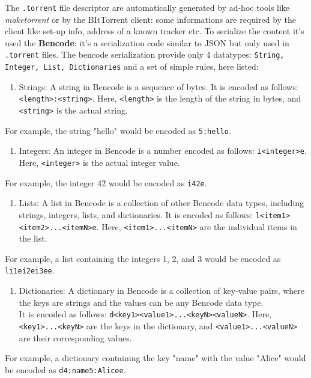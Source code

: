\documentclass[10pt,a4paper]{report}
\begin{document}
The \texttt{.torrent} file descriptor are automatically generated by ad-hoc tools like \textit{maketorrent} or by the BItTorrent client: some informations are required by the client like set-up info, address of a known tracker etc. To serialize the content it's used the \textbf{Bencode}: it's a serialization code similar to JSON but only used in \texttt{.torrent} files. The bencode serialization provide only 4 datatypes: \texttt{String, Integer, List, Dictionaries} and a set of simple rules, here listed:
\begin{enumerate}
	\item 
	Strings: A string in Bencode is a sequence of bytes. It is encoded as follows: \texttt{<length>:<string>}. Here, \texttt{<length>} is the length of the string in bytes, and \texttt{<string>} is the actual string.
\end{enumerate}

For example, the string "hello" would be encoded as \texttt{5:hello}.
\begin{enumerate}
	\item 
	Integers: An integer in Bencode is a number encoded as follows: \texttt{i<integer>e}. Here, \texttt{<integer>} is the actual integer value.
\end{enumerate}

For example, the integer 42 would be encoded as \texttt{i42e}.
\begin{enumerate}
	\item 
	Lists: A list in Bencode is a collection of other Bencode data types, including strings, integers, lists, and dictionaries. It is encoded as follows: \texttt{l<item1><item2>...<itemN>e}. Here, \texttt{<item1>...<itemN>} are the individual items in the list.
\end{enumerate}

For example, a list containing the integers 1, 2, and 3 would be encoded as \texttt{li1ei2ei3ee}.
\begin{enumerate}
	\item 
	Dictionaries: A dictionary in Bencode is a collection of key-value pairs, where the keys are strings and the values can be any Bencode data type.\\
	It is encoded as follows: \texttt{d<key1><value1>...<keyN><valueN>}. Here, \texttt{<key1>...<keyN>} are the keys in the dictionary, and \texttt{<value1>...<valueN>} are their corresponding values.
\end{enumerate}

For example, a dictionary containing the key "name" with the value "Alice" would be encoded as \texttt{d4:name5:Alicee}.
\end{document}
